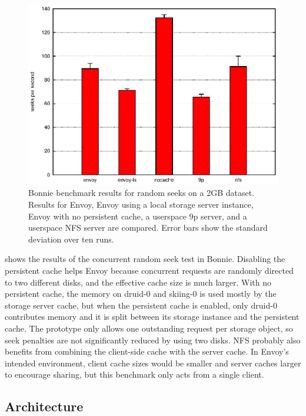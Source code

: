 \begin{figure}[t]
\centering
\includegraphics[width=\figwidth]{figures/bonnie-druid1-seek}
\caption[Bonnie benchmark results for random seeks]{Bonnie benchmark results for random seeks on a 2GB dataset. Results for Envoy, Envoy using a local storage server instance, Envoy with no persistent cache, a userspace 9p server, and a userspace NFS server are compared. Error bars show the standard deviation over ten runs.}
\label{fig:bonnie-druid1-seek}
\end{figure}

 shows the results of the concurrent random seek test in Bonnie. Disabling the persistent cache helps Envoy because concurrent requests are randomly directed to two different disks, and the effective cache size is much larger. With no persistent cache, the memory on druid-0 and skiing-0 is used mostly by the storage server cache, but when the persistent cache is enabled, only druid-0 contributes memory and it is split between its storage instance and the persistent cache. The prototype only allows one outstanding request per storage object, so seek penalties are not significantly reduced by using two disks. NFS probably also benefits from combining the client-side cache with the server cache. In Envoy's intended environment, client cache sizes would be smaller and server caches larger to encourage sharing, but this benchmark only acts from a single client.

\subsection{Architecture}\label{sec:architectural-costs}

